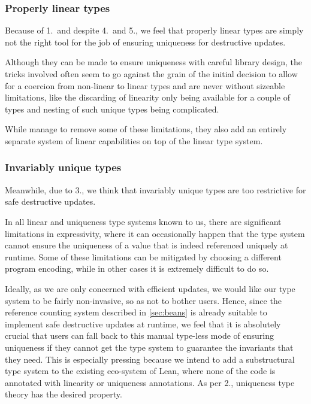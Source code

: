 \subsubsection{Properly linear types}
Because of 1.\ and despite 4.\ and 5., we feel that properly linear types are simply not the right tool for the job of ensuring uniqueness for destructive updates. 

Although they can be made to ensure uniqueness with careful library design, the tricks involved often seem to go against the grain of the initial decision to allow for a coercion from non-linear to linear types and are never without sizeable limitations, like the discarding of linearity only being available for a couple of types and nesting of such unique types being complicated. 

While \cite{spiwack_linearly_2022} manage to remove some of these limitations, they also add an entirely separate system of linear capabilities on top of the linear type system.

\subsubsection{Invariably unique types}
Meanwhile, due to 3., we think that invariably unique types are too restrictive for safe destructive updates. 

In all linear and uniqueness type systems known to us, there are significant limitations in expressivity, where it can occasionally happen that the type system cannot ensure the uniqueness of a value that is indeed referenced uniquely at runtime. Some of these limitations can be mitigated by choosing a different program encoding, while in other cases it is extremely difficult to do so. 

Ideally, as we are only concerned with efficient updates, we would like our type system to be fairly non-invasive, so as not to bother users. Hence, since the reference counting system described in \cref{sec:beans} is already suitable to implement safe destructive updates at runtime, we feel that it is absolutely crucial that users can fall back to this manual type-less mode of ensuring uniqueness if they cannot get the type system to guarantee the invariants that they need. This is especially pressing because we intend to add a substructural type system to the existing eco-system of Lean, where none of the code is annotated with linearity or uniqueness annotations. As per 2., uniqueness type theory has the desired property.

